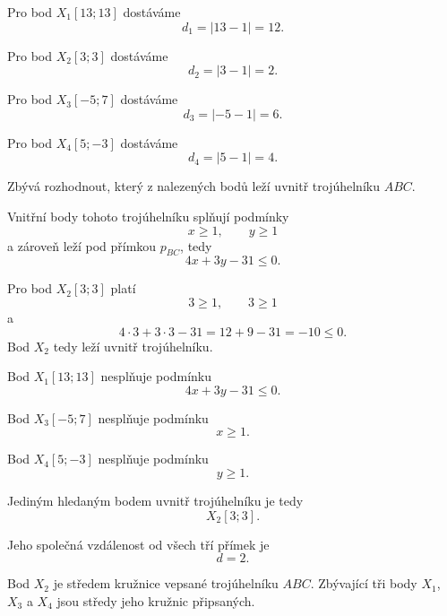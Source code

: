 \begin{example}
    Pro bod $X_1[13;13]$ dostáváme
    \[
        d_1=|13-1|=12.
    \]

    Pro bod $X_2[3;3]$ dostáváme
    \[
        d_2=|3-1|=2.
    \]

    Pro bod $X_3[-5;7]$ dostáváme
    \[
        d_3=|-5-1|=6.
    \]

    Pro bod $X_4[5;-3]$ dostáváme
    \[
        d_4=|5-1|=4.
    \]

    Zbývá rozhodnout, který z nalezených bodů leží uvnitř
    trojúhelníku $ABC$.

    Vnitřní body tohoto trojúhelníku splňují podmínky
    \[
        x\geq1,
        \qquad
        y\geq1
    \]
    a zároveň leží pod přímkou $p_{BC}$, tedy
    \[
        4x+3y-31\leq0.
    \]

    Pro bod $X_2[3;3]$ platí
    \[
        3\geq1,
        \qquad
        3\geq1
    \]
    a
    \[
        4\cdot3+3\cdot3-31
        =
        12+9-31
        =
        -10
        \leq0.
    \]
    Bod $X_2$ tedy leží uvnitř trojúhelníku.

    Bod $X_1[13;13]$ nesplňuje podmínku
    \[
        4x+3y-31\leq0.
    \]

    Bod $X_3[-5;7]$ nesplňuje podmínku
    \[
        x\geq1.
    \]

    Bod $X_4[5;-3]$ nesplňuje podmínku
    \[
        y\geq1.
    \]

    Jediným hledaným bodem uvnitř trojúhelníku je tedy
    \[
        X_2[3;3].
    \]

    Jeho společná vzdálenost od všech tří přímek je
    \[
        d=2.
    \]

    Bod $X_2$ je středem kružnice vepsané trojúhelníku $ABC$.
    Zbývající tři body $X_1$, $X_3$ a $X_4$ jsou středy jeho
    kružnic připsaných.

    \begin{figure}[H]
        \centering
\end{figure}
\end{example}
